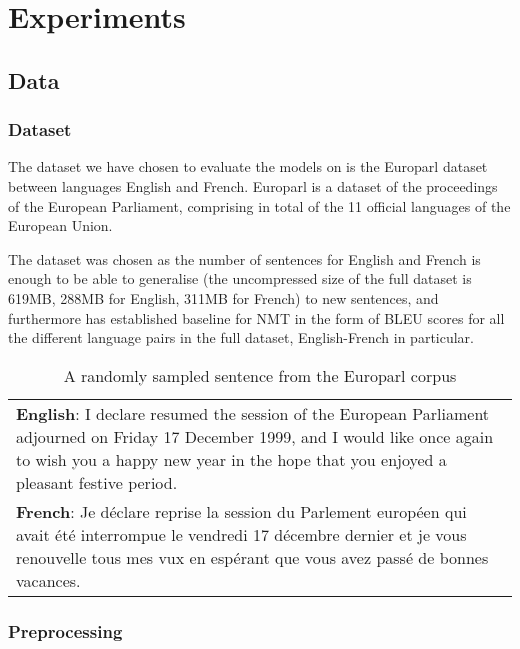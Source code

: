 \chapter{Experiments}
\label{ExperimentsCh}

\section{Data}

\subsection{Dataset}

The dataset we have chosen to evaluate the models on is the Europarl dataset
between languages English and French. Europarl is a dataset of the proceedings
of the European Parliament, comprising in total of the 11 official languages of
the European Union.

The dataset was chosen as the number of sentences for English and French is
enough to be able to generalise (the uncompressed size of the full dataset is
619MB, 288MB for English, 311MB for French) to new sentences, and furthermore has
established baseline for NMT in the form of BLEU scores for all the different
language pairs in the full dataset, English-French in particular.\cite{koehn2005epc}

\begin{table}[t]
  \begin{center}
    \begin{tabular}{ |p{}| } 
      \hline
      \textbf{English}: I declare resumed the session of the European Parliament adjourned on Friday 17 December 1999, and I would like once again to wish you a happy new year in the hope that you enjoyed a pleasant festive period.\\
      \textbf{French}: Je déclare reprise la session du Parlement européen qui avait été interrompue le vendredi 17 décembre dernier et je vous renouvelle tous mes vux en espérant que vous avez passé de bonnes vacances.\\
      \hline
    \end{tabular}
    \caption{A randomly sampled sentence from the Europarl corpus}
  \end{center}
\end{table}

\subsection{Preprocessing}


